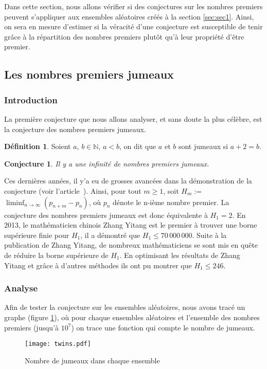 \documentclass[../main.tex]{subfiles}
\begin{document}
\theoremstyle{definition}
\newtheorem{Def}{Définition}

\theoremstyle{plain}
\newtheorem{Conj}{Conjecture}

    \label{sec:test2}
    Dans cette section, nous allons vérifier si des conjectures sur les nombres premiers peuvent s'appliquer aux ensembles aléatoires créés à la section \ref{sec:sec1}. Ainsi, on sera en mesure d'estimer si la véracité d'une conjecture est susceptible de tenir grâce à la répartition des nombres premiers plutôt qu'à leur propriété d'être premier. 
 
 \subsection{Les nombres premiers jumeaux} 
 \subsubsection{Introduction}
 	La première conjecture que nous allons analyser, et sans doute la plus célèbre, est la conjecture des nombres premiers jumeaux.
	\begin{Def}
	Soient $a$, $b \in \mathbb{N} $, $ a < b$, on dit que $a$ et $b$ sont jumeaux si $ a + 2 = b $.
	\end{Def}  
	
	\begin{Conj}
	Il y a une infinité de nombres premiers jumeaux.
	\end{Conj}
	
	Ces dernières années, il y'a eu de grosses avancées dans la démonstration de la conjecture (voir l'article~\cite{article_polymath}). Ainsi, pour tout $ m \geqslant 1$, soit $H_{m} := $ $\liminf_{n \rightarrow \infty}  (p_{n+m} - p_{n})$, où $p_{n}$ dénote le n-ième nombre premier. La conjecture des nombres premiers jumeaux est donc équivalente à $H_{1} = 2$. En 2013, le mathématicien chinois Zhang Yitang est le premier à trouver une borne supérieure finie pour $H_{1}$, il a démontré que $H_{1} \leqslant 70\, 000\, 000$. Suite à la publication de Zhang Yitang, de nombreux mathématiciens se sont mis en quête de réduire la borne supérieure de $H_{1}$. En optimisant les résultats de Zhang Yitang et grâce à d'autres méthodes ils ont pu montrer que $H_{1} \leqslant 246$.

\subsubsection{Analyse}
	Afin de tester la conjecture sur les ensembles aléatoires, nous avons tracé un graphe (figure \ref{im:image4}), où pour chaque ensembles aléatoires et l'ensemble des nombres premiers (jusqu'à $10^{7}$) on trace une fonction qui compte le nombre de jumeaux.
\begin{figure}[H]
 \centering
 \texttt{[image: twins.pdf]}
 \caption{Nombre de jumeaux dans chaque ensemble}
 \label{im:image4}
 \end{figure}
 
\end{document}
